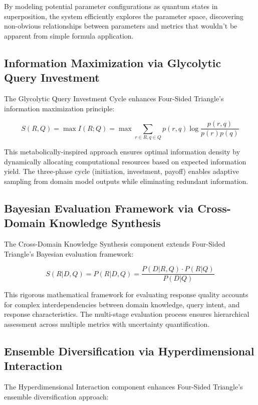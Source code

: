 \documentclass[journal,onecolumn]{IEEEtran}
\begin{document}
By modeling potential parameter configurations as quantum states in superposition, the system efficiently explores the parameter space, discovering non-obvious relationships between parameters and metrics that wouldn't be apparent from simple formula application.

\subsection{Information Maximization via Glycolytic Query Investment}

The Glycolytic Query Investment Cycle enhances Four-Sided Triangle's information maximization principle:

\begin{equation}
S(R, Q) = \max I(R; Q) = \max \sum_{r \in R, q \in Q} p(r, q) \log \frac{p(r, q)}{p(r)p(q)}
\end{equation}

This metabolically-inspired approach ensures optimal information density by dynamically allocating computational resources based on expected information yield. The three-phase cycle (initiation, investment, payoff) enables adaptive sampling from domain model outputs while eliminating redundant information.

\subsection{Bayesian Evaluation Framework via Cross-Domain Knowledge Synthesis}

The Cross-Domain Knowledge Synthesis component extends Four-Sided Triangle's Bayesian evaluation framework:

\begin{equation}
S(R|D, Q) = P(R|D, Q) = \frac{P(D|R, Q) \cdot P(R|Q)}{P(D|Q)}
\end{equation}

This rigorous mathematical framework for evaluating response quality accounts for complex interdependencies between domain knowledge, query intent, and response characteristics. The multi-stage evaluation process ensures hierarchical assessment across multiple metrics with uncertainty quantification.

\subsection{Ensemble Diversification via Hyperdimensional Interaction}

The Hyperdimensional Interaction component enhances Four-Sided Triangle's ensemble diversification approach:
\end{document}
